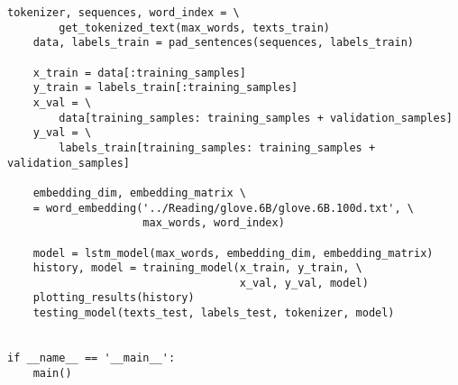 \begin{lstlisting}[language=iPython]
	tokenizer, sequences, word_index = \
		get_tokenized_text(max_words, texts_train)
	data, labels_train = pad_sentences(sequences, labels_train)
	
	x_train = data[:training_samples]
	y_train = labels_train[:training_samples]
	x_val = \
		data[training_samples: training_samples + validation_samples]
	y_val = \
		labels_train[training_samples: training_samples + validation_samples]
	
	embedding_dim, embedding_matrix \
	= word_embedding('../Reading/glove.6B/glove.6B.100d.txt', \
					 max_words, word_index)
	
	model = lstm_model(max_words, embedding_dim, embedding_matrix)
	history, model = training_model(x_train, y_train, \
									x_val, y_val, model)
	plotting_results(history)
	testing_model(texts_test, labels_test, tokenizer, model)


if __name__ == '__main__':
	main()

\end{lstlisting}
